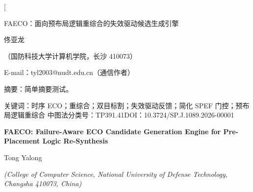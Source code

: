 \documentclass[twocolumn,10pt]{ctexart}
\begin{document}
\twocolumn[
\begin{center}
{\heiti{} FAECO：面向预布局逻辑重综合的失效驱动候选生成引擎}\par
\vspace{6pt}
{\fangsong{} 佟亚龙}\par
\vspace{4pt}
{\songti\fontsize{8}{12}\selectfont（国防科技大学计算机学院，长沙 410073）}\par\vspace{2pt}
{\songti\fontsize{8}{12}\selectfont E-mail：tyl2003@nudt.edu.cn（通信作者）}\par
\vspace{8pt}
\end{center}
\begin{flushleft}
{\heiti\fontsize{8.5}{13}\selectfont 摘\quad 要：}{\songti\fontsize{8.5}{13}\selectfont 简单摘要测试。}
\par
\vspace{4pt}
{\heiti\fontsize{8.5}{13}\selectfont 关键词：}{\songti\fontsize{8.5}{13}\selectfont 时序 ECO；重综合；双目标割；失效驱动反馈；简化 SPEF 门控；预布局逻辑重综合}
\vspace{2pt}
{\songti\fontsize{8.5}{13}\selectfont 中图法分类号：TP391.41\qquad DOI：10.3724/SP.J.1089.2026-00001}
\end{flushleft}
\vspace{6pt}
\begin{center}
{\bfseries\fontsize{13.5}{18}\selectfont FAECO: Failure-Aware ECO Candidate Generation Engine for Pre-Placement Logic Re-Synthesis}\par
\vspace{5pt}
{\normalsize Tong Yalong\par}
\vspace{3pt}
{\small \itshape (College of Computer Science, National University of Defense Technology, Changsha 410073, China)}\par
\vspace{6pt}
\end{center}
\end{document}
